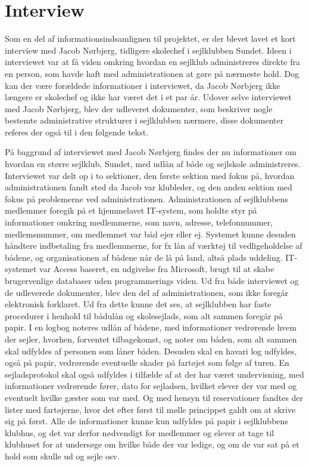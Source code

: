 \chapter{Interview}\label{chap:Interview}
Som en del af informationsindsamlignen til projektet, er der blevet lavet et kort interview med Jacob Nørbjerg, tidligere skolechef i sejlklubben Sundet. Ideen i interviewet var at få viden omkring hvordan en sejlklub administreres direkte fra en person, som havde haft med administrationen at gøre på nærmeste hold. Dog kan der være forældede informationer i interviewet, da Jacob Nørbjerg ikke længere er skolechef og ikke har været det i et par år. Udover selve interviewet med Jacob Nørbjerg, blev der udleveret dokumenter, som beskriver nogle bestemte administrative strukturer i sejlklubben nærmere, disse dokumenter referes der også til i den følgende tekst.

På baggrund af interviewet med Jacob Nørbjerg findes der nu informationer om hvordan en større sejlklub, Sundet, med udlån af både og sejlskole administreres. Interviewet var delt op i to sektioner, den første sektion med fokus på, hvordan administrationen fandt sted da Jacob var klubleder, og den anden sektion med fokus på problemerne ved administrationen. Administrationen af sejlklubbens medlemmer foregik på et hjemmelavet IT-system, som holdte styr på informationer omkring medlemmerne, som navn, adresse, telefonnummer, medlemsnummer, om medlemmet var båd ejer eller ej. Systemet kunne desuden håndtere indbetaling fra medlemmerne, for fx lån af værktøj til vedligeholdelse af bådene, og organisationen af bådene når de lå på land, altså plads uddeling. IT-systemet var Access baseret, en udgivelse fra Microsoft, brugt til at skabe brugervenlige databaser uden programmerings viden.
Ud fra både interviewet og de udleverede dokumenter, blev den del af administrationen, som ikke foregår elektronisk forklaret. Ud fra dette kunne det ses, at sejlklubben har faste procedurer i henhold til bådulån og skolesejlads, som alt sammen foregår på papir. I en logbog noteres udlån af bådene, med informationer vedrørende hvem der sejler, hvorhen, forventet tilbagekomst, og noter om båden, som alt sammen skal udfyldes af personen som låner båden. Desuden skal en havari log udfyldes, også på papir, vedrørende eventuelle skader på fartøjet som følge af turen. En sejladsprotokol skal også udfyldes i tilfælde af at der har været undervisning, med informationer vedrørende fører, dato for sejladsen, hvilket elever der var med og eventuelt hvilke gæster som var med. Og med hensyn til reservationer fandtes der lister med fartøjerne, hvor det efter først til mølle princippet galdt om at skrive sig på først. Alle de informationer kunne kun udfyldes på papir i sejlklubbens klubhus, og det var derfor nødvendigt for medlemmer og elever at tage til klubhuset for at undersøge om hvilke både der var ledige, og om de var sat på et hold som skulle ud og sejle osv. 

